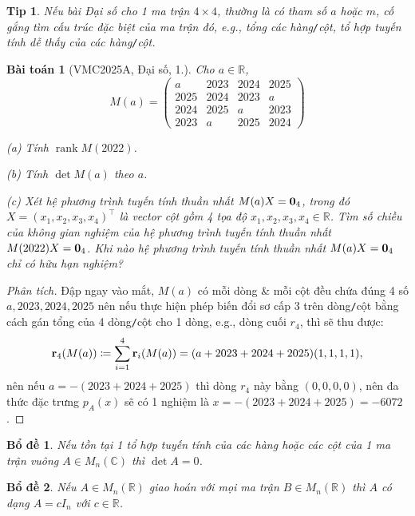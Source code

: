 \documentclass{article}
\newtheorem{baitoan}{Bài toán}
\newtheorem{bode}{Bổ đề}
\newtheorem{tip}{Tip}
\begin{document}
\begin{tip}
	Nếu bài Đại số cho 1 ma trận $4\times4$, thường là có tham số $a$ hoặc $m$, cố gắng tìm cấu trúc đặc biệt của ma trận đó, e.g., tổng các hàng{\tt/}cột, tổ hợp tuyến tính dễ thấy của các hàng{\tt/}cột.
\end{tip}

\begin{baitoan}[VMC2025A, Đại số, 1.]
	Cho $a\in\mathbb{R}$,
	\begin{equation*}
		M(a) = \begin{pmatrix}
			a & 2023 & 2024 & 2025\\2025 & 2024 & 2023 & a\\2024 & 2025 & a & 2023\\2023 & a & 2025 & 2024
		\end{pmatrix}
	\end{equation*}
	\item(a) Tính $\operatorname{rank}M(2022)$.
	\item(b) Tính $\det M(a)$ theo $a$.
	\item(c) Xét hệ phương trình tuyến tính thuần nhất $M(a)X = {\bf0}_4$, trong đó $X = (x_1,x_2,x_3,x_4)^\top$ là vector cột gồm 4 tọa độ $x_1,x_2,x_3,x_4\in\mathbb{R}$. Tìm số chiều của không gian nghiệm của hệ phương trình tuyến tính thuần nhất $M(2022)X = {\bf0}_4$. Khi nào hệ phương trình tuyến tính thuần nhất $M(a)X = {\bf0}_4$ chỉ có hữu hạn nghiệm?
\end{baitoan}

\begin{proof}[Phân tích]
	Đập ngay vào mắt, $M(a)$ có mỗi dòng \& mỗi cột đều chứa đúng 4 số $a,2023,2024,2025$ nên nếu thực hiện phép biến đổi sơ cấp 3 trên dòng{\tt/}cột bằng cách gán tổng của 4 dòng{\tt/}cột cho 1 dòng, e.g., dòng cuối $r_4$, thì sẽ thu được:
	\begin{equation*}
		{\bf r}_4(M(a))\coloneqq\sum_{i=1}^4 {\bf r}_i(M(a)) = (a + 2023 + 2024 + 2025)(1,1,1,1),
	\end{equation*}
	nên nếu $a = -(2023 + 2024 + 2025)$ thì dòng $r_4$ này bằng $(0,0,0,0)$, nên đa thức đặc trưng $p_A(x)$ sẽ có 1 nghiệm là $x = -(2023 + 2024 + 2025) = -6072$.
\end{proof}

\begin{bode}
	Nếu tồn tại 1 tổ hợp tuyến tính của các hàng hoặc các cột của 1 ma trận vuông $A\in M_n(\mathbb{C})$ thì $\det A = 0$.
\end{bode}

\begin{bode}
	Nếu $A\in M_n(\mathbb{R})$ giao hoán với mọi ma trận $B\in M_n(\mathbb{R})$ thì $A$ có dạng $A = cI_n$ với $c\in\mathbb{R}$.
\end{bode}
\end{document}
